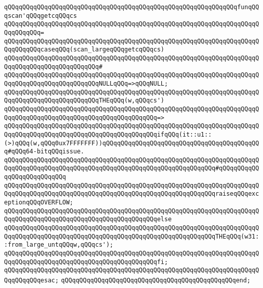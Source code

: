 \verb|qQQqqQQqqQQqqQQqqQQqqQQqqQQqqQQqqQQqqQQqqQQqqQQqqQQqqQQqqQQqqQQqfunqQQqscan'qQQqgetcqQQqcs|\newline
\verb|qQQqqQQqqQQqqQQqqQQqqQQqqQQqqQQqqQQqqQQqqQQqqQQqqQQqqQQqqQQqqQQqqQQqqQQqqQQqqQQq=|\newline
\verb|qQQqqQQqqQQqqQQqqQQqqQQqqQQqqQQqqQQqqQQqqQQqqQQqqQQqqQQqqQQqqQQqqQQqqQQqqQQqqQQqcaseqQQq(scan_largeqQQqgetcqQQqcs)|\newline
\verb|qQQqqQQqqQQqqQQqqQQqqQQqqQQqqQQqqQQqqQQqqQQqqQQqqQQqqQQqqQQqqQQqqQQqqQQqqQQqqQQqqQQqqQQqqQQqqQQq#|\newline
\verb|qQQqqQQqqQQqqQQqqQQqqQQqqQQqqQQqqQQqqQQqqQQqqQQqqQQqqQQqqQQqqQQqqQQqqQQqqQQqqQQqqQQqqQQqqQQqqQQqNULLqQQq=>qQQqNULL;|\newline
\newline
\verb|qQQqqQQqqQQqqQQqqQQqqQQqqQQqqQQqqQQqqQQqqQQqqQQqqQQqqQQqqQQqqQQqqQQqqQQqqQQqqQQqqQQqqQQqqQQqqQQqTHEqQQq(w,qQQqcs')|\newline
\verb|qQQqqQQqqQQqqQQqqQQqqQQqqQQqqQQqqQQqqQQqqQQqqQQqqQQqqQQqqQQqqQQqqQQqqQQqqQQqqQQqqQQqqQQqqQQqqQQqqQQqqQQqqQQqqQQq=>|\newline
\verb|qQQqqQQqqQQqqQQqqQQqqQQqqQQqqQQqqQQqqQQqqQQqqQQqqQQqqQQqqQQqqQQqqQQqqQQqqQQqqQQqqQQqqQQqqQQqqQQqqQQqqQQqqQQqqQQqifqQQq(it::u1::(>)qQQq(w,qQQq0ux7FFFFFFF))qQQqqQQqqQQqqQQqqQQqqQQqqQQqqQQqqQQqqQQqqQQq#qQQq64-bitqQQqissue.|\newline
\verb|qQQqqQQqqQQqqQQqqQQqqQQqqQQqqQQqqQQqqQQqqQQqqQQqqQQqqQQqqQQqqQQqqQQqqQQqqQQqqQQqqQQqqQQqqQQqqQQqqQQqqQQqqQQqqQQqqQQqqQQqqQQqqQQq#qQQqqQQqqQQqqQQqqQQqqQQqqQQq|\newline
\verb|qQQqqQQqqQQqqQQqqQQqqQQqqQQqqQQqqQQqqQQqqQQqqQQqqQQqqQQqqQQqqQQqqQQqqQQqqQQqqQQqqQQqqQQqqQQqqQQqqQQqqQQqqQQqqQQqqQQqqQQqqQQqqQQqraiseqQQqexceptionqQQqOVERFLOW;|\newline
\verb|qQQqqQQqqQQqqQQqqQQqqQQqqQQqqQQqqQQqqQQqqQQqqQQqqQQqqQQqqQQqqQQqqQQqqQQqqQQqqQQqqQQqqQQqqQQqqQQqqQQqqQQqqQQqqQQqelse|\newline
\verb|qQQqqQQqqQQqqQQqqQQqqQQqqQQqqQQqqQQqqQQqqQQqqQQqqQQqqQQqqQQqqQQqqQQqqQQqqQQqqQQqqQQqqQQqqQQqqQQqqQQqqQQqqQQqqQQqqQQqqQQqqQQqqQQqTHEqQQq(w31::from_large_untqQQqw,qQQqcs');|\newline
\verb|qQQqqQQqqQQqqQQqqQQqqQQqqQQqqQQqqQQqqQQqqQQqqQQqqQQqqQQqqQQqqQQqqQQqqQQqqQQqqQQqqQQqqQQqqQQqqQQqqQQqqQQqqQQqqQQqfi;|\newline
\verb|qQQqqQQqqQQqqQQqqQQqqQQqqQQqqQQqqQQqqQQqqQQqqQQqqQQqqQQqqQQqqQQqqQQqqQQqqQQqqQQqesac;|\newline
\verb|qQQqqQQqqQQqqQQqqQQqqQQqqQQqqQQqqQQqqQQqqQQqqQQqend;|\newline
